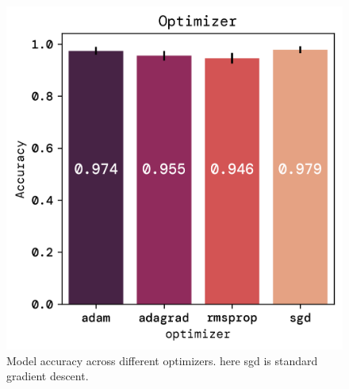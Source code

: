 \documentclass[twoside,11pt]{report}
\begin{document}
    \begin{figure}[ht]
        \begin{minipage}[t]{0.5\textwidth - 1mm}
            \begin{center}
                \includegraphics[width=\textwidth]{../runsAndFigures/accuracy_optimizer.png}
            \end{center}
            \caption
            {
                Model accuracy across different optimizers. here sgd is standard gradient descent.
            }\label{fig:accuracy_optimizer}
        \end{minipage}
        \hspace{2mm}
        \begin{minipage}[t]{0.5\textwidth - 1mm}
            \begin{center}

\end{center}
\end{minipage}
\end{figure}
\end{document}
